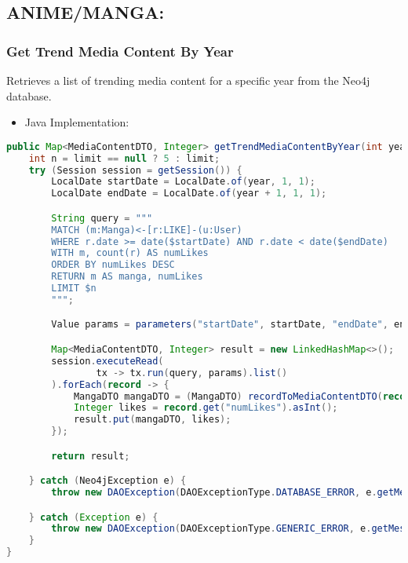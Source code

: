 \newpage

\subsection*{ANIME/MANGA:}
\subsubsection*{Get Trend Media Content By Year}

Retrieves a list of trending media content for a specific year from the Neo4j database.
\begin{itemize}
    \item Java Implementation:
\end{itemize}

\begin{mdframed}[style=customstyle]
\begin{lstlisting}[language=java]
public Map<MediaContentDTO, Integer> getTrendMediaContentByYear(int year, Integer limit) throws DAOException {
    int n = limit == null ? 5 : limit;
    try (Session session = getSession()) {
        LocalDate startDate = LocalDate.of(year, 1, 1);
        LocalDate endDate = LocalDate.of(year + 1, 1, 1);

        String query = """
        MATCH (m:Manga)<-[r:LIKE]-(u:User)
        WHERE r.date >= date($startDate) AND r.date < date($endDate)
        WITH m, count(r) AS numLikes
        ORDER BY numLikes DESC
        RETURN m AS manga, numLikes
        LIMIT $n
        """;

        Value params = parameters("startDate", startDate, "endDate", endDate, "n", n);

        Map<MediaContentDTO, Integer> result = new LinkedHashMap<>();
        session.executeRead(
                tx -> tx.run(query, params).list()
        ).forEach(record -> {
            MangaDTO mangaDTO = (MangaDTO) recordToMediaContentDTO(record);
            Integer likes = record.get("numLikes").asInt();
            result.put(mangaDTO, likes);
        });

        return result;

    } catch (Neo4jException e) {
        throw new DAOException(DAOExceptionType.DATABASE_ERROR, e.getMessage());

    } catch (Exception e) {
        throw new DAOException(DAOExceptionType.GENERIC_ERROR, e.getMessage());
    }
}\end{lstlisting}
\end{mdframed}

